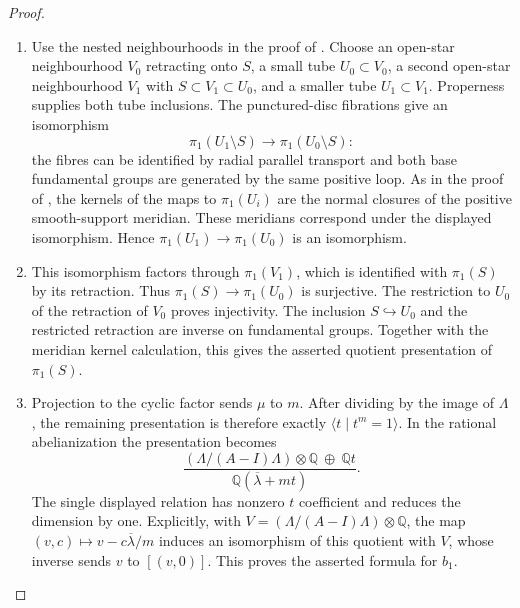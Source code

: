 \begin{proof}

\begin{enumerate}[label=\arabic*.,leftmargin=*]
\item Use the nested neighbourhoods in the proof of
. Choose an open-star
neighbourhood $V_0$ retracting onto $S$, a small tube
$U_0\subset V_0$, a second open-star neighbourhood
$V_1$ with $S\subset V_1\subset U_0$, and a smaller
tube $U_1\subset V_1$. Properness supplies both tube
inclusions. The punctured-disc fibrations give an
isomorphism
\[
 \pi_1(U_1\setminus S)\longrightarrow
 \pi_1(U_0\setminus S):
\]
the fibres can be identified by radial parallel
transport and both base fundamental groups are
generated by the same positive loop. As in the proof of
,
the kernels of the maps to $\pi_1(U_i)$ are the
normal closures of the positive smooth-support
meridian. These meridians correspond under the
displayed isomorphism. Hence
$\pi_1(U_1)\to\pi_1(U_0)$ is an isomorphism.

\item This isomorphism factors through $\pi_1(V_1)$,
which is identified with $\pi_1(S)$ by its
retraction. Thus $\pi_1(S)\to\pi_1(U_0)$ is
surjective. The restriction to $U_0$ of the
retraction of $V_0$ proves injectivity. The inclusion
$S\hookrightarrow U_0$ and the restricted retraction are
inverse on fundamental groups. Together with the meridian
kernel calculation, this gives the asserted quotient
presentation of $\pi_1(S)$.

\item Projection to the cyclic factor sends $\mu$ to
$m$. After dividing by the image of $\Lambda$,
the remaining presentation is therefore exactly
$\langle t\mid t^m=1\rangle$. In the rational
abelianization the presentation becomes
\[
 \frac{(\Lambda/(A-I)\Lambda)\otimes\mathbb Q
       \ \oplus\ \mathbb Qt}
      {\mathbb Q(\overline\lambda+mt)}.
\]
The single displayed relation has nonzero
$t$ coefficient and reduces the dimension by
one. Explicitly, with
$V=(\Lambda/(A-I)\Lambda)\otimes\mathbb Q$, the map
$(v,c)\mapsto v-c\overline\lambda/m$ induces an isomorphism
of this quotient with $V$, whose inverse sends $v$ to
$[(v,0)]$. This proves the asserted formula for $b_1$.


\end{enumerate}
\end{proof}
